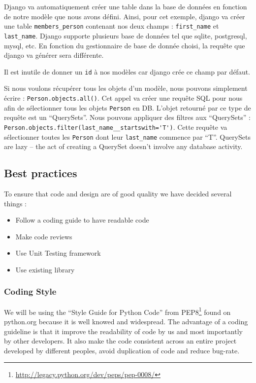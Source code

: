 \documentclass[11pt, a4paper]{article}   	%
\begin{document}
Django va automatiquement créer une table dans la base de données en fonction de notre modèle que nous avons défini.
Ainsi, pour cet exemple, django va créer une table \texttt{members\_person} contenant nos deux champs : \texttt{first\_name} et \texttt{last\_name}.
Django supporte plusieurs base de données tel que sqlite, postgresql, mysql, etc.
En fonction du gestionnaire de base de donnée choisi, la requête que django va générer sera différente. 

Il est inutile de donner un \texttt{id} à nos modèles car django crée ce champ par défaut.

Si nous voulons récupérer tous les objets d'un modèle, nous pouvons simplement écrire : \lstinline{Person.objects.all()}.
Cet appel va créer une requête SQL pour nous afin de sélectionner tous les objets \texttt{Person} en DB.
L'objet retourné par ce type de requête est un \enquote{QuerySets}.
Nous pouvons appliquer des filtres aux \enquote{QuerySets} : \lstinline{Person.objects.filter(last_name__startswith='T')}.
Cette requête va sélectionner toutes les \texttt{Person} dont leur \texttt{last\_name} commence par \enquote{T}.
QuerySets are lazy – the act of creating a QuerySet doesn’t involve any database activity.





\subsection{Best practices}

To ensure that code and design are of good quality we have decided several things :


\begin{itemize}
\item Follow a coding guide to have readable code
\item Make code reviews
\item Use Unit Testing framework
\item Use existing library
\end{itemize} 

\subsubsection{Coding Style}
	
We will be using the \enquote{Style Guide for Python Code} from PEP8\footnote{\url{http://legacy.python.org/dev/peps/pep-0008/}} found on python.org because it is well knowed and widespread. 
The advantage of a coding guideline is that it improve the readability of code by us and most importantly by other developers. 
It also make the code consistent across an entire project developed by different peoples, avoid duplication of code and reduce bug-rate. 
 
\end{document}
